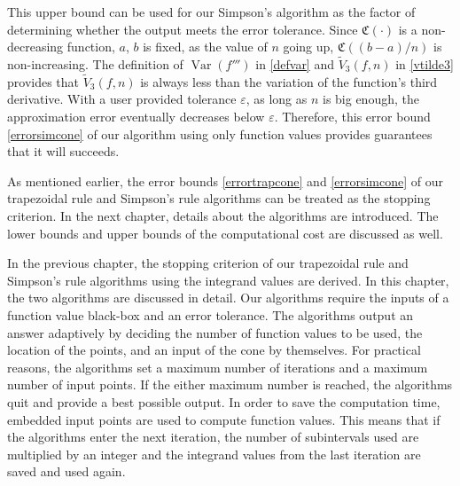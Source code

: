 \documentclass{iitthesis}
\DeclareMathOperator{\Var}{Var}
\theoremstyle{definition}
\theoremstyle{remark}
\begin{document}
This upper bound can be used for our Simpson's algorithm as the factor of determining whether the output meets the error tolerance. Since $\mathfrak{C}(\cdot)$ is a non-decreasing function, $a$, $b$ is fixed, as the value of $n$ going up, $\mathfrak{C}((b-a)/n)$ is non-increasing. The definition of $\Var(f''')$ in \eqref{defvar} and $\widetilde{V}_3(f,n)$ in \eqref{vtilde3} provides that $\widetilde{V}_3(f,n)$ is always less than the variation of the function's third derivative. With a user provided tolerance $\varepsilon$, as long as $n$ is big enough, the approximation error eventually decreases below $\varepsilon$.  Therefore, this error bound \eqref{errorsimcone} of our algorithm using only function values provides guarantees that it will succeeds.

As mentioned earlier, the error bounds \eqref{errortrapcone} and \eqref{errorsimcone} of our trapezoidal rule and Simpson's rule algorithms can be treated as the stopping criterion. In the next chapter, details about the algorithms are introduced. The lower bounds and upper bounds of the computational cost are discussed as well.

%






In the previous chapter, the stopping criterion of our trapezoidal rule and Simpson's rule algorithms using the integrand values are derived. In this chapter, the two algorithms are discussed in detail. Our algorithms require the inputs of a function value black-box and an error tolerance. The algorithms output an answer adaptively by deciding the number of function values to be used, the location of the points, and an input of the cone by themselves. For practical reasons, the algorithms set a maximum number of iterations and a maximum number of input points. If the either maximum number is reached, the algorithms quit and provide a best possible output. In order to save the computation time, embedded input points are used to compute function values. This means that if the algorithms enter the next iteration, the number of subintervals used are multiplied by an integer and the integrand values from the last iteration are saved and used again.
\end{document}
